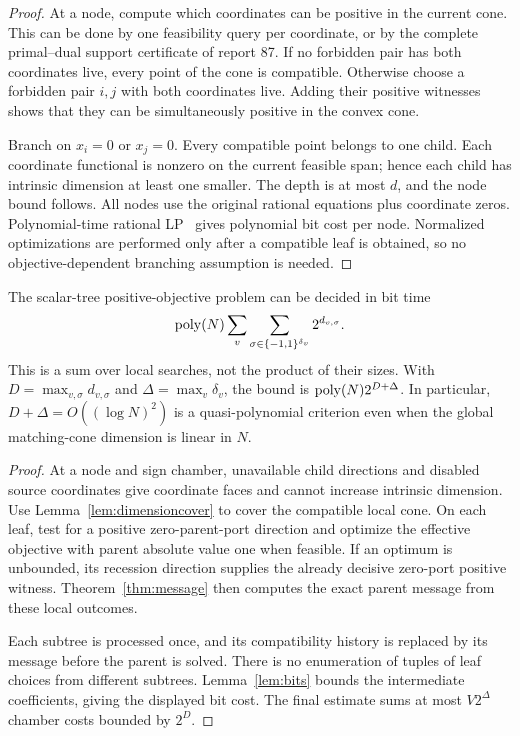 \begin{proof}
At a node, compute which coordinates can be positive in the current cone.
This can be done by one feasibility query per coordinate, or by the complete
primal--dual support certificate of report 87. If no forbidden pair has both
coordinates live, every point of the cone is compatible. Otherwise choose a
forbidden pair $i,j$ with both coordinates live. Adding their positive witnesses
shows that they can be simultaneously positive in the convex cone.

Branch on $x_i=0$ or $x_j=0$. Every compatible point belongs to one child.
Each coordinate functional is nonzero on the current feasible span; hence each
child has intrinsic dimension at least one smaller. The depth is at most $d$,
and the node bound follows. All nodes use the original rational equations plus
coordinate zeros. Polynomial-time rational LP~\cite{lp} gives polynomial bit
cost per node. Normalized optimizations are performed only after a compatible
leaf is obtained, so no objective-dependent branching assumption is needed.
\end{proof}

\begin{theorem}
\label{thm:intrinsic}
The scalar-tree positive-objective problem can be decided in bit time
\[
 \operatorname{poly}(N)\sum_v\sum_{\sigma\in\{-1,1\}^{\delta_v}}
                  2^{d_{v,\sigma}}.
\]
This is a sum over local searches, not the product of their sizes. With
$D=\max_{v,\sigma}d_{v,\sigma}$ and $\Delta=\max_v\delta_v$, the bound is
$\operatorname{poly}(N)2^{D+\Delta}$. In particular, $D+\Delta=O((\log N)^2)$ is a
quasi-polynomial criterion even when the global matching-cone dimension is
linear in $N$.
\end{theorem}

\begin{proof}
At a node and sign chamber, unavailable child directions and disabled source
coordinates give coordinate faces and cannot increase intrinsic dimension.
Use Lemma~\ref{lem:dimensioncover} to cover the compatible local cone. On each
leaf, test for a positive zero-parent-port direction and optimize the effective
objective with parent absolute value one when feasible. If an optimum is
unbounded, its recession direction supplies the already decisive zero-port
positive witness. Theorem~\ref{thm:message} then computes the exact parent
message from these local outcomes.

Each subtree is processed once, and its compatibility history is replaced by
its message before the parent is solved. There is no enumeration of tuples of
leaf choices from different subtrees. Lemma~\ref{lem:bits} bounds the intermediate
coefficients, giving the displayed bit cost. The final estimate sums at most
$V2^\Delta$ chamber costs bounded by $2^D$.
\end{proof}

